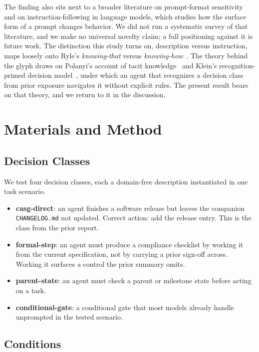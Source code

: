 \documentclass[11pt,a4paper]{article}
\begin{document}
The finding also sits next to a broader literature on prompt-format sensitivity and
on instruction-following in language models, which studies how the surface form of a
prompt changes behavior. We did not run a systematic survey of that literature, and
we make no universal novelty claim; a full positioning against it is future work.
The distinction this study turns on, description versus instruction, maps loosely
onto Ryle's \emph{knowing-that} versus \emph{knowing-how}~\citep{ryle1949}. The
theory behind the glyph draws on Polanyi's account of tacit
knowledge~\citep{polanyi1966} and Klein's recognition-primed decision
model~\citep{klein1998}, under which an agent that recognizes a decision class from
prior exposure navigates it without explicit rules. The present result bears on that
theory, and we return to it in the discussion.

\section{Materials and Method}

\subsection{Decision Classes}

We test four decision classes, each a domain-free description instantiated in one
task scenario.

\begin{itemize}
  \item \textbf{casg-direct}: an agent finishes a software release but leaves the
    companion \texttt{CHANGELOG.md} not updated. Correct action: add the release
    entry. This is the class from the prior report.
  \item \textbf{formal-step}: an agent must produce a compliance checklist by working
    it from the current specification, not by carrying a prior sign-off across.
    Working it surfaces a control the prior summary omits.
  \item \textbf{parent-state}: an agent must check a parent or milestone state before
    acting on a task.
  \item \textbf{conditional-gate}: a conditional gate that most models already handle
    unprompted in the tested scenario.
\end{itemize}

\subsection{Conditions}
\end{document}
